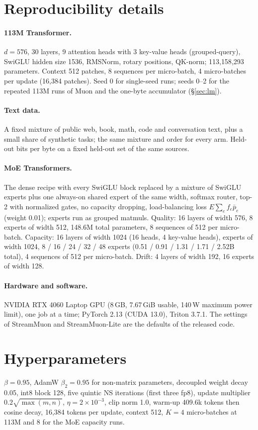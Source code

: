 \documentclass[10pt]{article}
\newcommand{\method}{StreamMuon}\newcommand{\lite}{StreamMuon-Lite}
\begin{document}
\FloatBarrier
\section{Reproducibility details}
\label{app:repro}
\paragraph{113M Transformer.} $d=576$, 30 layers, 9 attention heads with 3 key-value heads (grouped-query), SwiGLU
hidden size 1536, RMSNorm, rotary positions, QK-norm; 113{,}158{,}293 parameters. Context 512 patches, 8 sequences per
micro-batch, 4 micro-batches per update (16{,}384 patches). Seed 0 for single-seed runs; seeds 0--2 for the repeated
113M runs of Muon and the one-byte accumulator (\S\ref{sec:lm}).
\paragraph{Text data.} A fixed mixture of public web, book, math, code and conversation text, plus a small share of
synthetic tasks; the same mixture and order for every arm. Held-out bits per byte on a fixed held-out set of the same
sources.
\paragraph{MoE Transformers.} The dense recipe with every SwiGLU block replaced by a mixture of SwiGLU experts plus
one always-on shared expert of the same width, softmax router, top-2 with normalized gates, no capacity dropping,
load-balancing loss $E\sum_e f_e\bar p_e$ (weight 0.01); experts run as grouped matmuls. Quality: 16 layers of width
576, 8 experts of width 512, 148.6M total parameters, 8 sequences of 512 per micro-batch. Capacity: 16 layers of width
1024 (16 heads, 4 key-value heads), experts of width 1024, 8 / 16 / 24 / 32 / 48 experts (0.51 / 0.91 / 1.31 / 1.71 /
2.52B total), 4 sequences of 512 per micro-batch. Drift: 4 layers of width 192, 16 experts of width 128.
\paragraph{Hardware and software.} NVIDIA RTX 4060 Laptop GPU (8\,GB, 7.67\,GiB usable, 140\,W maximum power limit),
one job at a time; PyTorch 2.13 (CUDA 13.0), Triton 3.7.1. The settings of \method{} and \lite{} are the defaults
of the released code.

\FloatBarrier
\section{Hyperparameters}
$\beta=0.95$, AdamW $\beta_2=0.95$ for non-matrix parameters, decoupled weight decay 0.05, int8 block 128, five quintic
NS iterations (first three fp8), update multiplier $0.2\sqrt{\max(m,n)}$, $\eta=2\times10^{-3}$, clip norm 1.0, warm-up
409.6k tokens then cosine decay, 16{,}384 tokens per update, context 512, $K=4$ micro-batches at 113M and 8 for the MoE capacity
runs.
\end{document}
